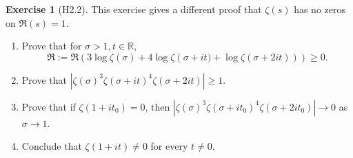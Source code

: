 \documentclass[reqno]{amsart}
\theoremstyle{definition}
\newtheorem{exercise}[theorem]{Exercise}
\theoremstyle{remark}
\begin{document}
\begin{exercise}[H2.2]
    This exercise gives a different proof that
    $\zeta(s)$ has no zeros on
    $\Re(s) = 1$.
    \begin{enumerate}
        \item Prove that for
            $\sigma > 1, t \in \mathbb{R}$,
            \[
            \Re := \Re \left( 3 \log \zeta (\sigma)
            + 4 \log \zeta \left( \sigma + it)
        + \log \zeta \left( \sigma+ 2it \right) \right) \right) 
        \ge 0.
            \] 
        \item Prove that
            $\left| \zeta(\sigma)^3
            \zeta \left( \sigma + it \right)^{4} 
            \zeta\left( \sigma + 2it \right) \right| \ge 1 $.
        \item Prove that if $\zeta \left( 1+ it_0 \right) =0$,
            then
            $\left| \zeta(\sigma)^3
            \zeta\left( \sigma + it_0 \right)^{4}
            \zeta \left( \sigma + 2it_0 \right) \right| 
            \to 0$ as $\sigma \to 1$.
        \item Conclude that $\zeta \left( 1+it \right) \neq 0
            $ for every $t \neq 0$.
    \end{enumerate}
\end{exercise}
\end{document}
